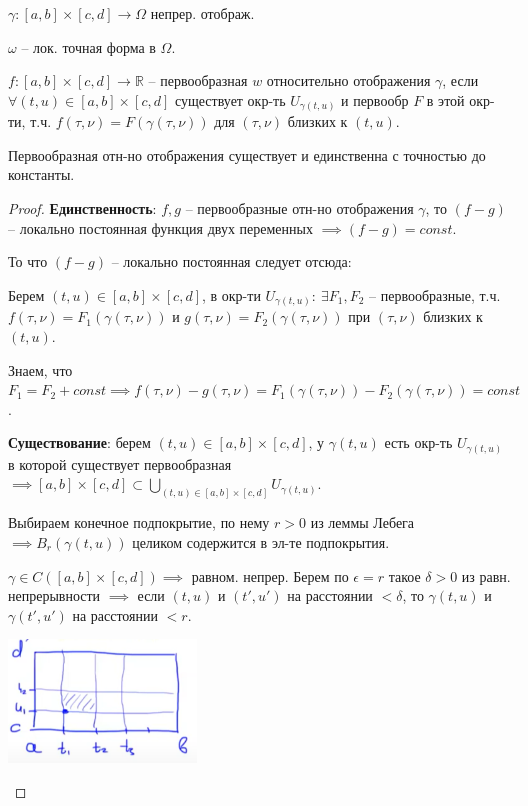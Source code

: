 \begin{definition}
    $\gamma: [a, b] \times [c, d] \rightarrow \Omega$ непрер. отображ.
    
    $\omega$ -- лок. точная форма в $\Omega$.

    $f: [a, b] \times [c, d] \rightarrow \mathbb{R}$ -- первообразная $w$ относительно отображения $\gamma$, если $\forall (t, u) \in [a, b] \times [c, d]$ существует окр-ть $U_{\gamma(t, u)}$ и первообр $F$ в этой окр-ти, т.ч. $f(\tau, \nu) = F(\gamma(\tau, \nu))$ для $(\tau, \nu)$ близких к $(t, u)$.
\end{definition}

\begin{theorem}
    Первообразная отн-но отображения существует и единственна с точностью до константы.
\end{theorem}
\begin{proof}

    \textbf{Единственность}: $f, g$ -- первообразные отн-но отображения $\gamma$, то $(f - g)$ -- локально постоянная функция двух переменных $\implies (f - g) = const$.

    То что $(f - g)$ -- локально постоянная следует отсюда:

    Берем $(t, u) \in [a, b] \times [c, d]$, в окр-ти $U_{\gamma(t, u)}: \ \exists F_1, F_2$ -- первообразные, т.ч. $f(\tau, \nu) = F_1(\gamma(\tau, \nu))$ и $g(\tau, \nu) = F_2(\gamma(\tau, \nu))$ при $(\tau, \nu)$ близких к $(t, u)$.

    Знаем, что $F_1 = F_2 + const \implies f(\tau, \nu) - g(\tau, \nu) = F_1(\gamma(\tau, \nu)) - F_2(\gamma(\tau, \nu)) = const$.

    \newpage
    \textbf{Существование}: берем $(t, u) \in [a, b] \times [c, d]$, у $\gamma(t, u)$ есть окр-ть $U_{\gamma(t, u)}$ в которой существует первообразная $\implies [a, b] \times [c, d] \subset \bigcup_{(t, u) \in [a, b] \times [c, d]} {U_{\gamma(t, u)}}$.
    
    Выбираем конечное подпокрытие, по нему $r > 0$ из леммы Лебега $\implies B_r(\gamma(t, u))$ целиком содержится в эл-те подпокрытия.
    
    $\gamma \in C\left( [a, b] \times [c, d] \right) \implies $ равном. непрер. Берем по $\epsilon = r$ такое $\delta > 0$ из равн. непрерывности $\implies$ если $(t, u)$ и $(t', u')$ на расстоянии $< \delta$, то $\gamma(t, u)$ и $\gamma(t', u')$ на расстоянии $< r$.

    \begin{center}
        \includegraphics[width=5cm]{assets/03-intergrals-with-params/existance-proof-pic-1.png}
    \end{center}



\end{proof}
